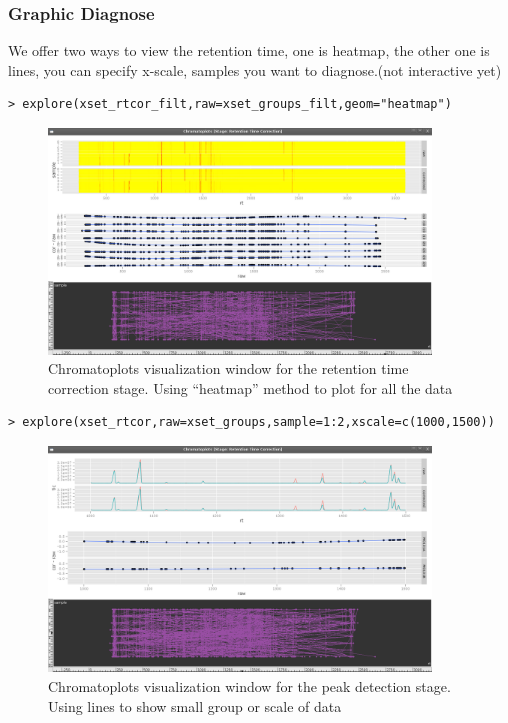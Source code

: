 \documentclass[11pt,a4paper]{article}
\begin{document}
\subsubsection*{Graphic Diagnose}
We offer two ways to view the retention time, one is heatmap, the other one is
lines, you can specify x-scale, samples you want to diagnose.(not interactive yet)
\begin{verbatim}
> explore(xset_rtcor_filt,raw=xset_groups_filt,geom="heatmap")
\end{verbatim}
\begin{figure}[h!t!b!p]
\begin{center}
  \includegraphics[width=4in]{rt_heat.png}
  \caption{\label{fig:findpeaks}Chromatoplots visualization window for
    the retention time correction stage. Using ``heatmap'' method to
    plot for all the data}
\end{center}
\end{figure}
\begin{verbatim}
> explore(xset_rtcor,raw=xset_groups,sample=1:2,xscale=c(1000,1500))
\end{verbatim}
\begin{figure}[h!t!b!p]
\begin{center}
  \includegraphics[width=4in]{rt_tic.png}
  \caption{\label{fig:findpeaks}Chromatoplots visualization window for
    the peak detection stage. Using lines to show small group or scale of data}
\end{center}
\end{figure}
\end{document}
